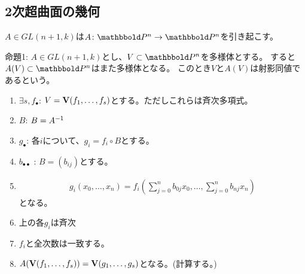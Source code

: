 \subsection{2次超曲面の幾何}
\label{sub:2次超曲面の幾何}
$A\in GL(n+1,k)$は$A\colon \P^n \to \P^n$を引き起こす。

\begin{framed}
  命題1:
  $A\in GL(n+1,k)$とし、$V\subset \P^n$を多様体とする。
  すると$A(V)\subset \P^n$はまた多様体となる。
  このとき$V$と$A(V)$は射影同値であるという。
\end{framed}
\begin{myproof}
  \begin{enumerate}
    \item $\exists s, f_\bullet$: $V=\textbf V(f_1,\dots,f_s)$とする。ただしこれらは斉次多項式。
    \item $B$: $B=A^{-1}{}$
    \item $g_\bullet$: 各$i$について、$g_i = f_i\circ B$とする。
    \item $b_{\bullet \bullet}$ : $B=(b_{ij})$とする。
    \item
    \begin{align}
      g_i(x_0,\dots,x_n)
      =
      f_i(\sum_{j=0}^n b_{0j}x_0,\dots, \sum_{j=0}^n b_{nj}x_n)
    \end{align}
    となる。
    \item
    上の各$g_i$は斉次
    \item
    $f_i$と全次数は一致する。
    \item
    $A(\textbf V(f_1,\dots,f_s)) = \textbf V(g_1,\dots,g_s)$となる。(計算する。)
  \end{enumerate}
\end{myproof}

